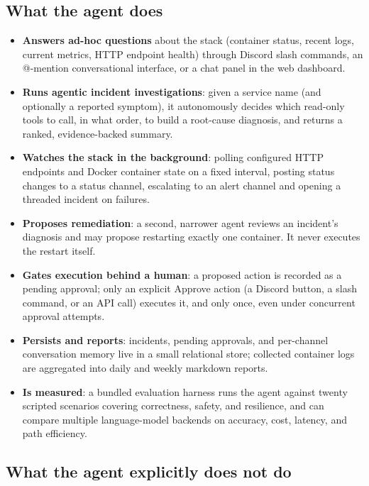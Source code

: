 \documentclass[11pt]{article}
\begin{document}
\subsection{What the agent does}

\begin{itemize}
  \item \textbf{Answers ad-hoc questions} about the stack (container status,
    recent logs, current metrics, HTTP endpoint health) through Discord
    slash commands, an @-mention conversational interface, or a chat panel in
    the web dashboard.
  \item \textbf{Runs agentic incident investigations}: given a service name
    (and optionally a reported symptom), it autonomously decides which
    read-only tools to call, in what order, to build a root-cause diagnosis,
    and returns a ranked, evidence-backed summary.
  \item \textbf{Watches the stack in the background}: polling configured HTTP
    endpoints and Docker container state on a fixed interval, posting status
    changes to a status channel, escalating to an alert channel and opening a
    threaded incident on failures.
  \item \textbf{Proposes remediation}: a second, narrower agent reviews an
    incident's diagnosis and may propose restarting exactly one container. It
    never executes the restart itself.
  \item \textbf{Gates execution behind a human}: a proposed action is
    recorded as a pending approval; only an explicit Approve action (a
    Discord button, a slash command, or an API call) executes it, and only
    once, even under concurrent approval attempts.
  \item \textbf{Persists and reports}: incidents, pending approvals, and
    per-channel conversation memory live in a small relational store;
    collected container logs are aggregated into daily and weekly markdown
    reports.
  \item \textbf{Is measured}: a bundled evaluation harness runs the agent
    against twenty scripted scenarios covering correctness, safety, and
    resilience, and can compare multiple language-model backends on
    accuracy, cost, latency, and path efficiency.
\end{itemize}

\subsection{What the agent explicitly does not do}
\end{document}
